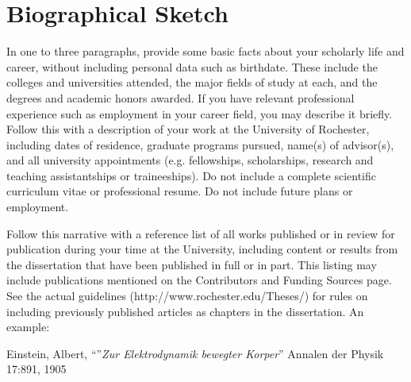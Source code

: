\documentclass[\main/master.tex]{subfiles}
\begin{document}
\chapter*{Biographical Sketch}
\hspace{5 mm} In one to three paragraphs, provide some basic facts about your scholarly life and career, without including personal data such as birthdate. These include the colleges and universities attended, the major fields of study at each, and the degrees and academic honors awarded. If you have relevant professional experience such as employment in your career field, you may describe it briefly. Follow this with a description of your work at the University of Rochester, including dates of residence, graduate programs pursued, name(s) of advisor(s), and all university appointments (e.g. fellowships, scholarships, research and teaching assistantships or traineeships). Do not include a complete scientific curriculum vitae or professional resume. Do not include future plans or employment. \par
Follow this narrative with a reference list of all works published or in review for publication during your
time at the University, including content or results from the dissertation that have been published in full or in
part. This listing may include publications mentioned on the Contributors and Funding Sources page. See the actual guidelines (http://www.rochester.edu/Theses/) for rules on including previously published articles as chapters in the dissertation. \newline 
An example: \par
[1] Einstein, Albert, ``''\emph{Zur Elektrodynamik bewegter Korper}'' Annalen der Physik 17:891, 1905 \newline
\end{document}
